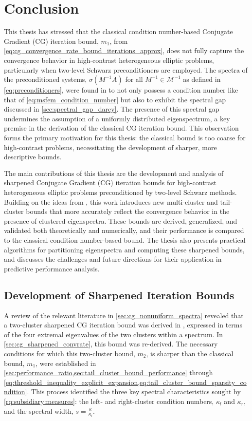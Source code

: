 \chapter{Conclusion}\label{ch:conclusion}
This thesis has stressed that the classical condition number-based Conjugate Gradient (CG) iteration bound, $m_1$, from \cref{eq:cg_convergence_rate_bound_iterations_approx}, does not fully capture the convergence behavior in high-contrast heterogeneous elliptic problems, particularly when two-level Schwarz preconditioners are employed. The spectra of the preconditioned systems, $\sigma(M^{-1}A)$ for all $M^{-1}\in\mathcal{M}^{-1}$ as defined in \cref{eq:preconditioners}, were found in \cite{ams_coarse_space_comp_study_Alves2024} to not only possess a condition number like that of \cref{eq:msfem_condition_number} but also to exhibit the spectral gap discussed in \cref{sec:spectral_gap_darcy}. The presence of this spectral gap undermines the assumption of a uniformly distributed eigenspectrum, a key premise in the derivation of the classical CG iteration bound. This observation forms the primary motivation for this thesis: the classical bound is too coarse for high-contrast problems, necessitating the development of sharper, more descriptive bounds.

The main contributions of this thesis are the development and analysis of sharpened Conjugate Gradient (CG) iteration bounds for high-contrast heterogeneous elliptic problems preconditioned by two-level Schwarz methods. Building on the ideas from \cite[Section 4]{cg_sharpened_convrate_Axelsson1976}, this work introduces new multi-cluster and tail-cluster bounds that more accurately reflect the convergence behavior in the presence of clustered eigenspectra. These bounds are derived, generalized, and validated both theoretically and numerically, and their performance is compared to the classical condition number-based bound. The thesis also presents practical algorithms for partitioning eigenspectra and computing these sharpened bounds, and discusses the challenges and future directions for their application in predictive performance analysis.

\section{Development of Sharpened Iteration Bounds}
A review of the relevant literature in \cref{sec:cg_nonuniform_spectra} revealed that a two-cluster sharpened CG iteration bound was derived in \cite[Section 4]{cg_sharpened_convrate_Axelsson1976}, expressed in terms of the four extremal eigenvalues of the two clusters within a spectrum. In \cref{sec:cg_sharpened_convrate}, this bound was re-derived. The necessary conditions for which this two-cluster bound, $m_2$, is sharper than the classical bound, $m_1$, were established in \cref{sec:performance_ratio,sec:tail_cluster_bound_performance} through \cref{eq:threshold_inequality_explicit_expansion,eq:tail_cluster_bound_sparsity_condition}. This process identified the three key spectral characteristics sought by \ref{rq:subsidiary:measures}: the left- and right-cluster condition numbers, $\kappa_l$ and $\kappa_r$, and the spectral width, $s = \frac{\kappa}{\kappa_l}$.

